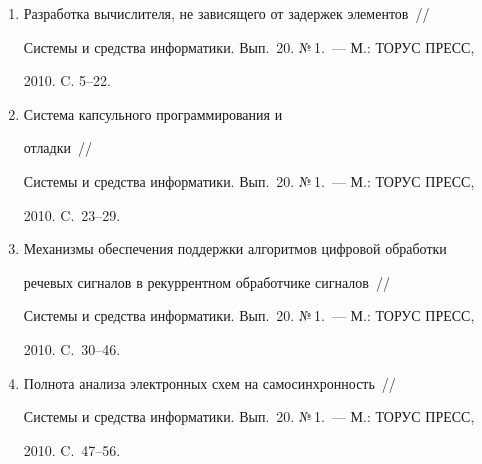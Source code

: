 \vspace*{-2pt}


  


\noindent


\begin{enumerate}[1.]


\item {}


Разработка вычислителя, не зависящего от задержек элементов~/\!\!/


Системы и средства информатики. Вып.~20. №\,1.~--- М.: ТОРУС ПРЕСС, 


2010. C. 5--22.


\item {}


Система капсульного программирования и\linebreak\vspace*{-12pt}


\pagebreak





 отладки~/\!\!/


Системы и средства информатики. Вып.~20. №\,1.~--- М.: ТОРУС ПРЕСС, 


2010. C.~23--29. 


\item {}


Механизмы обеспечения поддержки алгоритмов цифровой обработки 


речевых сигналов в рекуррентном обработчике сигналов~/\!\!/


Сис\-те\-мы и средства информатики. Вып.~20. №\,1.~--- М.: ТОРУС ПРЕСС, 


2010. C.~30--46.


\item {}


Полнота анализа электронных схем на самосинхронность~/\!\!/


Сис\-те\-мы и средства информатики. Вып.~20. №\,1.~--- М.: ТОРУС ПРЕСС, 


2010. C.~47--56.



\end{enumerate}
